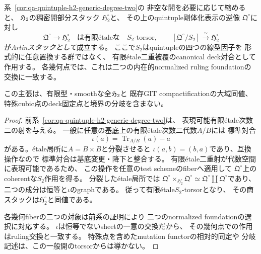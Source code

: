 \begin{theorem}
\label{thm:qa-h2-generic-ruling-quotient}
系~\ref{cor:qa-quintuple-h2-generic-degree-two}の
非空な開を必要に応じて縮めると、
$\mathfrak H_2$の稠密開部分スタック
$\mathfrak H_2^\circ$と、
その上のquintuple剛体化表示の逆像
$\mathfrak Q^\circ$に対し
\[
 \mathfrak Q^\circ\longrightarrow
 \mathfrak H_2^\circ
 \quad\text{は有限étaleな}\quad S_2\text{-torsor},\qquad
 [\mathfrak Q^\circ/S_2]\xrightarrow{\ \sim\ }
 \mathfrak H_2^\circ
 \tag{OU-H2-quot}\label{eq:qa-h2-generic-ruling-quotient}
\]
が\emph{Artinスタックとして}成立する。
ここで$S_2$はquintupleの四つの線型因子を
形式的に任意置換する群ではなく、
有限étale二重被覆のcanonical deck対合として作用する。
各幾何点では、これは二つの内在的normalized ruling
foundationの交換に一致する。

この主張は、有限型・smoothな全$\mathfrak H_2$と
既存GIT compactificationの大域同値、
特殊cubic点のdeck固定点と境界の分岐を含まない。
\end{theorem}
\begin{proof}
前系~\ref{cor:qa-quintuple-h2-generic-degree-two}は、
表現可能有限étale次数二の射を与える。
一般に任意の基底上の有限étale次数二代数$A/B$には
標準対合
\[
  \iota(a)=\operatorname{Tr}_{A/B}(a)-a
\]
がある。étale局所に$A=B\times B$と分裂させると
$\iota(a,b)=(b,a)$であり、互換操作なので
標準対合は基底変更・降下と整合する。
有限étale二重射が代数空間に表現可能であるため、
この操作を任意のtest schemeのfiberへ適用して
$\mathfrak Q^\circ$上のcoherentな$S_2$作用を得る。
分裂したétale局所では
$\mathfrak Q^\circ\times_{\mathfrak H_2^\circ}
\mathfrak Q^\circ\simeq
\mathfrak Q^\circ\amalg\mathfrak Q^\circ$であり、
二つの成分は恒等と$\iota$のgraphである。
従って有限étale$S_2$-torsorとなり、
その商スタックは$\mathfrak H_2^\circ$と同値である。

各幾何fiberの二つの対象は前系の証明により
二つのnormalized foundationの選択に対応する。
$\iota$は恒等でないsheetの一意の交換だから、
その幾何点での作用はruling交換と一致する。
特殊点を含めたmutation functorの相対的同定や
分岐記述は、この一般開のtorsorからは導かない。
\end{proof}

